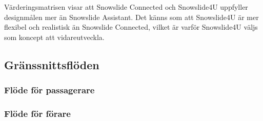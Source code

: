 \documentclass[a4paper,12pt,titlepage]{article}
\begin{document}
Värderingsmatrisen visar att Snowslide Connected och Snowslide4U
uppfyller designmålen mer än Snowslide Assistant. Det känns som att Snowslide4U
är mer flexibel och realistisk än Snowslide Connected, vilket är
varför Snowslide4U väljs som koncept att vidareutveckla.

\subsection*{Gränssnittsflöden}

\subsubsection*{Flöde för passagerare}
\subsubsection*{Flöde för förare}
\end{document}

